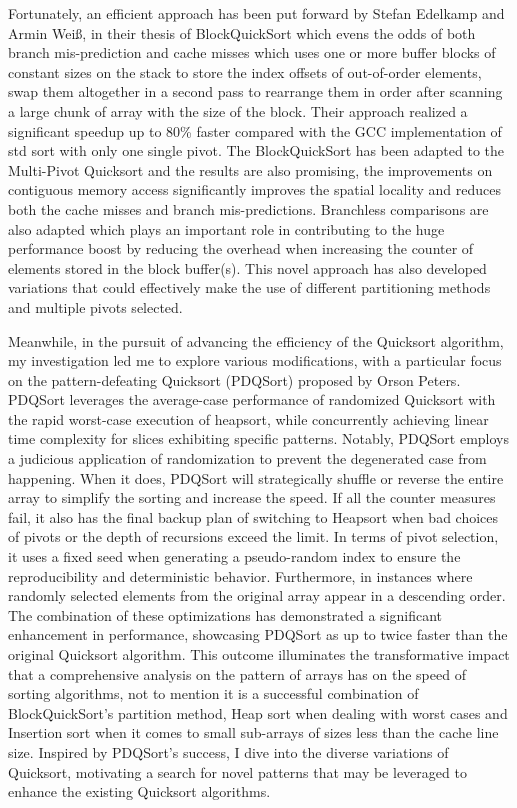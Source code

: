 \documentclass{article}
\begin{document}
Fortunately, an efficient approach has been put forward by Stefan Edelkamp and Armin Weiß,
in their thesis of BlockQuickSort \cite{BlockQuickSort}
which evens the odds of both branch mis-prediction and cache misses which uses one or more buffer blocks of constant sizes on the stack
to store the index offsets of out-of-order elements, swap them altogether in a second pass to rearrange them in order
after scanning a large chunk of array with the size of the block. Their approach realized a significant speedup up to 80\% faster compared with the GCC implementation of std sort
with only one single pivot. The BlockQuickSort has been adapted to the Multi-Pivot Quicksort and the results are also promising,
the improvements on contiguous memory access significantly improves the spatial locality and reduces both the cache misses and branch mis-predictions.
Branchless comparisons are also adapted which plays an important role in contributing to the huge performance boost by reducing the overhead
when increasing the counter of elements stored in the block buffer(s).
This novel approach has also developed variations that could effectively make the use of different partitioning methods and multiple pivots selected. 

Meanwhile, in the pursuit of advancing the efficiency of the Quicksort algorithm,
my investigation led me to explore various modifications, 
with a particular focus on the pattern-defeating Quicksort (PDQSort) proposed by Orson Peters. 
PDQSort leverages the average-case performance of randomized Quicksort with the rapid worst-case execution of heapsort, 
while concurrently achieving linear time complexity for slices exhibiting specific patterns. 
Notably, PDQSort employs a judicious application of randomization to prevent the degenerated case from happening.
When it does, PDQSort will strategically shuffle or reverse the entire array to simplify the sorting and increase the speed.
If all the counter measures fail, it also has the final backup plan of switching to Heapsort when bad choices of pivots or the depth of recursions exceed the limit. 
In terms of pivot selection, it uses a fixed seed when generating a pseudo-random index to ensure the reproducibility and deterministic behavior.
Furthermore, in instances where randomly selected elements from the original array appear in a descending order.
The combination of these optimizations has demonstrated a significant enhancement in performance, showcasing PDQSort as up to twice faster than the original Quicksort algorithm. 
This outcome illuminates the transformative impact that a comprehensive analysis on the pattern of arrays has on the speed of sorting algorithms,
not to mention it is a successful combination of BlockQuickSort's partition method,
Heap sort when dealing with worst cases and Insertion sort when it comes to small sub-arrays of sizes less than the cache line size. 
Inspired by PDQSort's success, I dive into the diverse variations of Quicksort,
motivating a search for novel patterns that may be leveraged to enhance the existing Quicksort algorithms.
\end{document}
